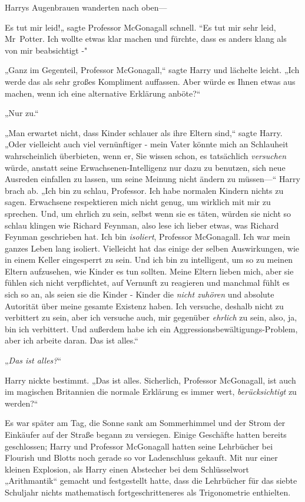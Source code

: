 {Harrys Augenbrauen wanderten nach oben—

Es tut mir leid!„ sagte Professor McGonagall schnell. “Es tut mir sehr leid, Mr~Potter. Ich wollte etwas klar machen und fürchte, dass es anders klang als von mir beabsichtigt -"

„Ganz im Gegenteil, Professor McGonagall,“ sagte Harry und lächelte leicht. „Ich werde das als sehr großes Kompliment auffassen. Aber würde es Ihnen etwas aus machen, wenn ich eine alternative Erklärung anböte?“

„Nur zu.“

„Man erwartet nicht, dass Kinder schlauer als ihre Eltern sind,“ sagte Harry. „Oder vielleicht auch viel vernünftiger - mein Vater könnte mich an Schlauheit wahrscheinlich überbieten, wenn er, Sie wissen schon, es tatsächlich \emph{versuchen} würde, anstatt seine Erwachsenen-Intelligenz nur dazu zu benutzen, sich neue Ausreden einfallen zu lassen, um seine Meinung nicht ändern zu müssen—“ Harry brach ab. „Ich bin zu schlau, Professor. Ich habe normalen Kindern nichts zu sagen. Erwachsene respektieren mich nicht genug, um wirklich mit mir zu sprechen. Und, um ehrlich zu sein, selbst wenn sie es täten, würden sie nicht so schlau klingen wie Richard Feynman, also lese ich lieber etwas, was Richard Feynman geschrieben hat. Ich bin \emph{isoliert}, Professor McGonagall. Ich war mein ganzes Leben lang isoliert. Vielleicht hat das einige der selben Auswirkungen, wie in einem Keller eingesperrt zu sein. Und ich bin zu intelligent, um so zu meinen Eltern aufzusehen, wie Kinder es tun sollten. Meine Eltern lieben mich, aber sie fühlen sich nicht verpflichtet, auf Vernunft zu reagieren und manchmal fühlt es sich so an, als seien sie die Kinder - Kinder die \emph{nicht zuhören} und absolute Autorität über meine gesamte Existenz haben. Ich versuche, deshalb nicht zu verbittert zu sein, aber ich versuche auch, mir gegenüber \emph{ehrlich} zu sein, also, ja, bin ich verbittert. Und außerdem habe ich ein Aggressionsbewältigungs-Problem, aber ich arbeite daran. Das ist alles.“

„\emph{Das ist alles?}“

Harry nickte bestimmt. „Das ist alles. Sicherlich, Professor McGonagall, ist auch im magischen Britannien die normale Erklärung es immer wert, \emph{berücksichtigt} zu werden?“

\later

Es war später am Tag, die Sonne sank am Sommerhimmel und der Strom der Einkäufer auf der Straße begann zu versiegen. Einige Geschäfte hatten bereits geschlossen; Harry und Professor McGonagall hatten seine Lehrbücher bei Flourish und Blotts noch gerade so vor Ladenschluss gekauft. Mit nur einer kleinen Explosion, als Harry einen Abstecher bei dem Schlüsselwort „Arithmantik“ gemacht und festgestellt hatte, dass die Lehrbücher für das siebte Schuljahr nichts mathematisch fortgeschritteneres als Trigonometrie enthielten.

}
